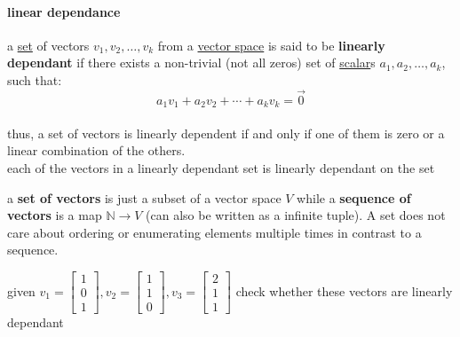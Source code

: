 \documentclass[a4paper,12pt]{article}
\begin{document}
\paragraph{linear dependance}
\label{sec:org174d95a}
\begin{definition}
a \href{discrete_maths2.org}{set} of vectors \(v_1, v_2, \ldots, v_k\) from a \hyperref[sec:orgea93933]{vector space} is said to be \textbf{linearly dependant} if there exists a non-trivial (not all zeros) set of \href{20220727110413-scalar.org}{scalar}s \(a_1,a_2,\ldots,a_k\), such that:\\
\[
  a_1v_1 + a_2v_2 + \cdots + a_kv_k = \vec0
\]\\
thus, a set of vectors is linearly dependent if and only if one of them is zero or a linear combination of the others.\\
each of the vectors in a linearly dependant set is linearly dependant on the set\\

\begin{note}
a \textbf{set of vectors} is just a subset of a vector space \(V\) while a \textbf{sequence of vectors} is a map \(\mathbb{N} \rightarrow V\) (can also be written as a infinite tuple). A set does not care about ordering or enumerating elements multiple times in contrast to a sequence.\\
\end{note}
\begin{my_example}
given \(v_1= \left[\begin{array}{r} 1 \\ 0 \\ 1 \end{array}\right] ,v_2= \left[\begin{array}{r} 1 \\ 1 \\ 0 \end{array}\right] ,v_3= \left[\begin{array}{r} 2 \\ 1 \\ 1 \end{array}\right]\) check whether these vectors are linearly dependant\\


\end{my_example}
\end{definition}
\end{document}
